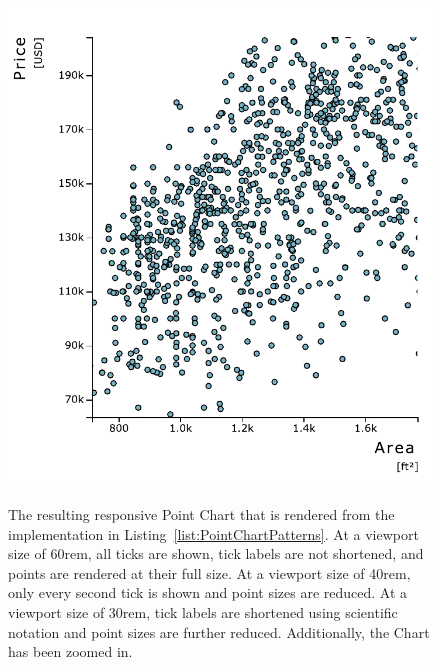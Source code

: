 \begin{figure}[tp]
{  \includegraphics[valign=b,scale=\respscale]{diagrams/respvis-point-30rem-zoomed.pdf}%
  \label{fig:PointChartPatterns30remZoomed}%
}
\caption[Responsive RespVis Point Chart]{%
The resulting responsive Point Chart that is rendered from the
implementation in Listing~\ref{list:PointChartPatterns}.
 At a viewport size of 60rem, all
ticks are shown, tick labels are not shortened, and points are
rendered at their full size.   At
a viewport size of 40rem, only every second tick is shown and point
sizes are reduced.
 At a viewport size of
30rem, tick labels are shortened using scientific notation and point
sizes are further reduced. Additionally, the Chart has been zoomed in.
}
\label{fig:PointChartPatterns}
\end{figure}


